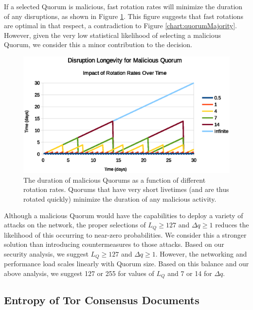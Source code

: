 If a selected Quorum is malicious, fast rotation rates will minimize the duration of any disruptions, as shown in Figure \ref{chart:quorumLongevity}. This figure suggests that fast rotations are optimal in that respect, a contradiction to Figure \ref{chart:quorumMajority}. However, given the very low statistical likelihood of selecting a malicious Quorum, we consider this a minor contribution to the decision.

\begin{figure}[htbp]
	\centering
	\includegraphics[width=1\textwidth]{analysis/MaliciousLongevityRotations.eps}
	\caption{The duration of malicious Quorums as a function of different rotation rates. Quorums that have very short livetimes (and are thus rotated quickly) minimize the duration of any malicious activity.}
	\label{chart:quorumLongevity}
\end{figure}

Although a malicious Quorum would have the capabilities to deploy a variety of attacks on the network, the proper selections of $ L_{Q} \geq 127 $ and $ \Delta q \geq 1 $ reduces the likelihood of this occurring to near-zero probabilities. We consider this a stronger solution than introducing countermeasures to those attacks. Based on our security analysis, we suggest $ L_{Q} \geq 127 $ and $ \Delta q \geq 1 $. However, the networking and performance load scales linearly with Quorum size. Based on this balance and our above analysis, we suggest 127 or 255 for values of $ L_{Q} $ and 7 or 14 for $ \Delta q $.

\newpage

\subsection{Entropy of Tor Consensus Documents}
\label{sec:docEntropy}

